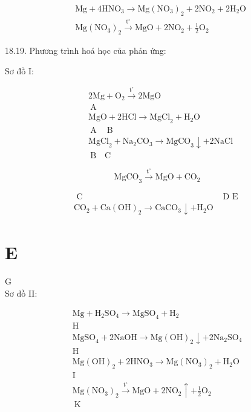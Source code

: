 \documentclass[10pt]{article}
\begin{document}
$$
\begin{aligned}
& \mathrm{Mg}+4 \mathrm{HNO}_{3} \rightarrow \mathrm{Mg}\left(\mathrm{NO}_{3}\right)_{2}+2 \mathrm{NO}_{2}+2 \mathrm{H}_{2} \mathrm{O} \\
& \mathrm{Mg}\left(\mathrm{NO}_{3}\right)_{2} \xrightarrow{\mathrm{t}^{\circ}} \mathrm{MgO}+2 \mathrm{NO}_{2}+\frac{1}{2} \mathrm{O}_{2}
\end{aligned}
$$

18.19. Phương trình hoá học của phản ứng:

Sơ đồ I:

$$
\begin{aligned}
& 2 \mathrm{Mg}+\mathrm{O}_{2} \xrightarrow{\mathrm{t}^{\circ}} 2 \mathrm{MgO} \\
& \mathrm{~A} \\
& \mathrm{MgO}+2 \mathrm{HCl} \rightarrow \mathrm{MgCl}_{2}+\mathrm{H}_{2} \mathrm{O} \\
& \mathrm{~A} \quad \mathrm{~B} \\
& \mathrm{MgCl}_{2}+\mathrm{Na}_{2} \mathrm{CO}_{3} \rightarrow \mathrm{MgCO}_{3} \downarrow+2 \mathrm{NaCl} \\
& \mathrm{~B} \quad \mathrm{C}
\end{aligned}
$$

$$
\mathrm{MgCO}_{3} \xrightarrow{\mathrm{t}^{\circ}} \mathrm{MgO}+\mathrm{CO}_{2}
$$

$$
\begin{array}{cc}
\text { C } & \text { D E } \\
\mathrm{CO}_{2}+\mathrm{Ca}(\mathrm{OH})_{2} \rightarrow \mathrm{CaCO}_{3} \downarrow+\mathrm{H}_{2} \mathrm{O}
\end{array}
$$

\section*{E}
G\\
Sơ đồ II:

$$
\begin{gathered}
\mathrm{Mg}+\mathrm{H}_{2} \mathrm{SO}_{4} \rightarrow \mathrm{MgSO}_{4}+\mathrm{H}_{2} \\
\mathrm{H} \\
\mathrm{MgSO}_{4}+2 \mathrm{NaOH} \rightarrow \mathrm{Mg}(\mathrm{OH})_{2} \downarrow+2 \mathrm{Na}_{2} \mathrm{SO}_{4} \\
\mathrm{H} \\
\mathrm{Mg}(\mathrm{OH})_{2}+2 \mathrm{HNO}_{3} \rightarrow \mathrm{Mg}\left(\mathrm{NO}_{3}\right)_{2}+\mathrm{H}_{2} \mathrm{O} \\
\mathrm{I} \\
\mathrm{Mg}\left(\mathrm{NO}_{3}\right)_{2} \xrightarrow{\mathrm{t}^{\circ}} \mathrm{MgO}+2 \mathrm{NO}_{2} \uparrow+\frac{1}{2} \mathrm{O}_{2} \\
\mathrm{~K}
\end{gathered}
$$
\end{document}
